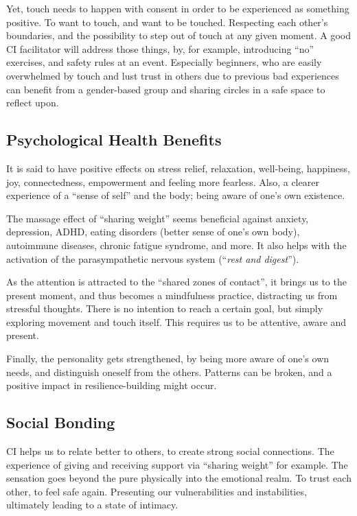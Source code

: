 Yet, touch needs to happen with consent in order to be experienced as something positive.
To want to touch, and want to be touched.
Respecting each other's boundaries, and the possibility to step out of touch at any given moment.
A good CI facilitator will address those things, by, for example, introducing ``no'' exercises, and safety rules at an event.
Especially beginners, who are easily overwhelmed by touch and lust trust in others due to previous bad experiences can benefit from a gender-based group and sharing circles in a safe space to reflect upon.

\subsection{Psychological Health Benefits}\label{subsec:psychological-health-benefits}

It is said to have positive effects on stress relief, relaxation, well-being, happiness, joy, connectedness, empowerment and feeling more fearless.
Also, a clearer experience of a ``sense of self'' and the body; being aware of one's own existence.

The massage effect of ``sharing weight'' seems beneficial against anxiety, depression, ADHD, eating disorders (better sense of one's own body), autoimmune diseases, chronic fatigue syndrome, and more.
It also helps with the activation of the parasympathetic nervous system (``\textit{rest and digest}'').

As the attention is attracted to the ``shared zones of contact'', it brings us to the present moment, and thus becomes a mindfulness practice, distracting us from stressful thoughts.
There is no intention to reach a certain goal, but simply exploring movement and touch itself.
This requires us to be attentive, aware and present.

Finally, the personality gets strengthened, by being more aware of one's own needs, and distinguish oneself from the others.
Patterns can be broken, and a positive impact in resilience-building might occur.

\subsection{Social Bonding}\label{subsec:social-bonding}

CI helps us to relate better to others, to create strong social connections.
The experience of giving and receiving support via ``sharing weight'' for example.
The sensation goes beyond the pure physically into the emotional realm.
To trust each other, to feel safe again.
Presenting our vulnerabilities and instabilities, ultimately leading to a state of intimacy.

